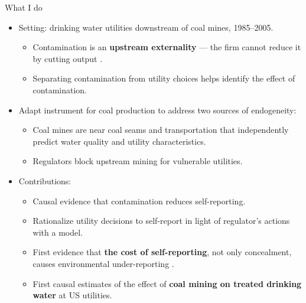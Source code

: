 \documentclass{beamer}
\begin{document}
\begin{frame}{What I do}
\begin{itemize}
    \item Setting: drinking water utilities downstream of coal mines, 1985--2005.
    \begin{itemize}
        \item Contamination is an \textbf{upstream externality} --- the firm cannot reduce it by cutting output \parencite{bennear2005strategic}.
        \item Separating contamination from utility choices helps identify the effect of contamination.
    \end{itemize}
    \item Adapt \textcite{stratford2015coalprod} instrument for coal production to address two sources of endogeneity:
    \begin{itemize}
        \item Coal mines are near coal seams and transportation that independently predict water quality and utility characteristics.
        \item Regulators block upstream mining for vulnerable utilities.
    \end{itemize}
    \item Contributions:
    \begin{itemize}
        \item Causal evidence that contamination reduces self-reporting.
        \item Rationalize utility decisions to self-report in light of regulator's actions with a model.
        \item First evidence that \textbf{the cost of self-reporting}, not only concealment, causes environmental under-reporting \parencite{naylor5537637strategic, zou2021unwatched}.
        \item First causal estimates of the effect of \textbf{coal mining on treated drinking water} at US utilities.
    \end{itemize}
\end{itemize}
\end{frame}
\end{document}

